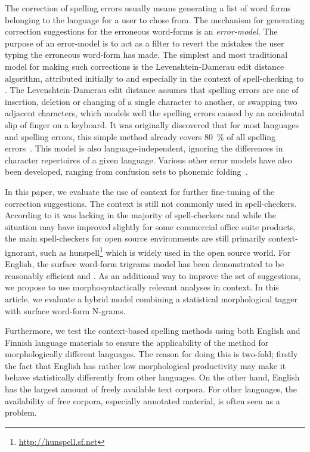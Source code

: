 \documentclass{llncs}
\begin{document}
The correction of spelling errors usually means generating a list of word forms
belonging to the language for a user to chose from. The mechanism for generating 
correction suggestions for the erroneous word-forms
is an \emph{error-model}. The purpose of an error-model is to act as a
filter to revert the mistakes the user typing the erroneous word-form has made.
The simplest and most traditional model for making such corrections is the
Levenshtein-Damerau edit distance algorithm, attributed initially to
\cite{levenshtein/1966} and especially in the context of spell-checking to
\cite{damerau/1964}. The Levenshtein-Damerau edit distance assumes that spelling
errors are one of insertion, deletion or changing of a single character to
another, or swapping two adjacent characters, which models well the spelling
errors caused by an accidental slip of finger on a keyboard. It was originally
discovered that for most languages and spelling errors, this simple method
already covers 80~\% of all spelling errors~\cite{damerau/1964}. This model is
also language-independent, ignoring the differences in character repertoires of
a given language. Various other error models have also been developed, ranging
from confusion sets to phonemic folding~\cite{kukich/1992}.

In this paper, we evaluate the use of context for further fine-tuning of the
correction suggestions. The context is still not commonly used in
spell-checkers. According to \cite{kukich/1992} it was lacking in the majority
of spell-checkers and while the situation may have improved slightly for some
commercial office suite products, the main spell-checkers for open source
environments are still primarily context-ignorant, such as
hunspell\footnote{\url{http://hunspell.sf.net}} which is widely used in the open source
world.  For English, the surface word-form trigrams model has been demonstrated
to be reasonably efficient \cite[for non-word cases]{church/1991} and
\cite[for real-word cases]{mays/1991}. As an additional way to improve the 
set of suggestions, we propose to use morphosyntactically
relevant analyses in context. In this
article, we evaluate a hybrid model combining a statistical
morphological tagger~\cite{silfverberg/2011} with surface word-form
N-grams.

Furthermore, we test the context-based spelling methods using both English and
Finnish language materials to ensure the applicability of the method for
morphologically different languages. The reason for doing this is two-fold; firstly
the fact that English has rather low morphological productivity may make
it behave statistically differently from other languages. On the other hand,
English has the largest amount of freely available text corpora. For other
languages, the availability of free corpora, especially annotated material, is
often seen as a problem.
\end{document}
